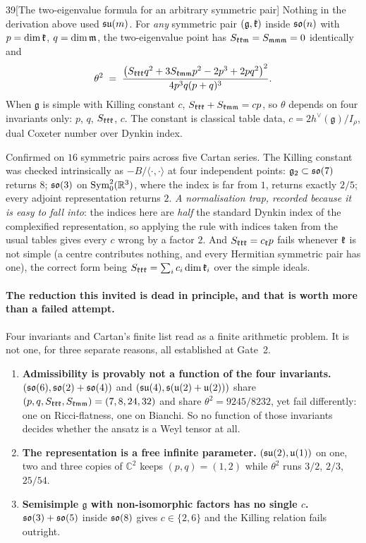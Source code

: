 \begin{Lem}{39}[The two-eigenvalue formula for an arbitrary symmetric pair]
Nothing in the derivation above used $\mathfrak{su}(m)$. For \emph{any} symmetric pair $(\mathfrak g,\mathfrak{k})$ inside $\mathfrak{so}(n)$ with $p=\dim\mathfrak{k}$, $q=\dim\mathfrak{m}$, the two-eigenvalue point has $S_{\mathfrak{k}\mathfrak{k}\mathfrak{m}}=S_{\mathfrak{m}\mathfrak{m}\mathfrak{m}}=0$ identically and
\[
\theta^2\;=\;\frac{\big(S_{\mathfrak{k}\mathfrak{k}\mathfrak{k}}q^2+3S_{\mathfrak{k}\mathfrak{m}\mathfrak{m}}p^2-2p^3+2pq^2\big)^2}{4p^3q(p+q)^3}.
\]
When $\mathfrak g$ is simple with Killing constant $c$, $S_{\mathfrak{k}\mathfrak{k}\mathfrak{k}}+S_{\mathfrak{k}\mathfrak{m}\mathfrak{m}}=cp$, so $\theta$ depends on four invariants only: $p$, $q$, $S_{\mathfrak{k}\mathfrak{k}\mathfrak{k}}$, $c$. The constant is classical table data, $c=2h^\vee(\mathfrak g)/I_\rho$, dual Coxeter number over Dynkin index.
\end{Lem}

\begin{certificate}
Confirmed on $16$ symmetric pairs across five Cartan series. The Killing constant was checked intrinsically as $-B/\langle\cdot,\cdot\rangle$ at four independent points: $\mathfrak g_2\subset\mathfrak{so}(7)$ returns $8$; $\mathfrak{so}(3)$ on $\mathrm{Sym}^2_0(\mathbb{R}^3)$, where the index is far from $1$, returns exactly $2/5$; every adjoint representation returns $2$. \emph{A normalisation trap, recorded because it is easy to fall into}: the indices here are \emph{half} the standard Dynkin index of the complexified representation, so applying the rule with indices taken from the usual tables gives every $c$ wrong by a factor $2$. And $S_{\mathfrak{k}\mathfrak{k}\mathfrak{k}}=c_{\mathfrak{k}}p$ fails whenever $\mathfrak{k}$ is not simple (a centre contributes nothing, and every Hermitian symmetric pair has one), the correct form being $S_{\mathfrak{k}\mathfrak{k}\mathfrak{k}}=\sum_ic_i\dim\mathfrak{k}_i$ over the simple ideals.
\end{certificate}

\paragraph{The reduction this invited is dead in principle, and that is worth more than a failed attempt.} Four invariants and Cartan's finite list read as a finite arithmetic problem. It is not one, for three separate reasons, all established at Gate~2.

\begin{enumerate}[leftmargin=1.8em,nosep]
\item \textbf{Admissibility is provably not a function of the four invariants.} $(\mathfrak{so}(6),\mathfrak{so}(2)+\mathfrak{so}(4))$ and $(\mathfrak{su}(4),\mathfrak s(\mathfrak{u}(2)+\mathfrak{u}(2)))$ share $(p,q,S_{\mathfrak{k}\mathfrak{k}\mathfrak{k}},S_{\mathfrak{k}\mathfrak{m}\mathfrak{m}})=(7,8,24,32)$ and share $\theta^2=9245/8232$, yet fail differently: one on Ricci-flatness, one on Bianchi. So no function of those invariants decides whether the ansatz is a Weyl tensor at all.
\item \textbf{The representation is a free infinite parameter.} $(\mathfrak{su}(2),\mathfrak{u}(1))$ on one, two and three copies of $\mathbb C^2$ keeps $(p,q)=(1,2)$ while $\theta^2$ runs $3/2$, $2/3$, $25/54$.
\item \textbf{Semisimple $\mathfrak g$ with non-isomorphic factors has no single $c$.} $\mathfrak{so}(3)+\mathfrak{so}(5)$ inside $\mathfrak{so}(8)$ gives $c\in\{2,6\}$ and the Killing relation fails outright.
\end{enumerate}

